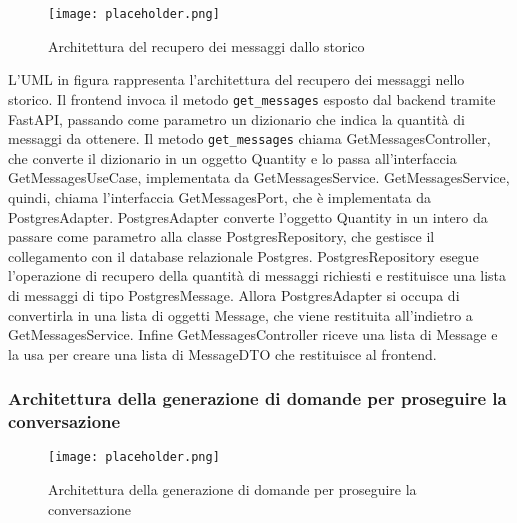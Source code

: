 \begin{figure}[h]
    \centering
    \texttt{[image: placeholder.png]}
    \caption{Architettura del recupero dei messaggi dallo storico}
\end{figure}

L'UML in figura rappresenta l'architettura del recupero dei messaggi nello storico.
Il frontend invoca il metodo \texttt{get\_messages} esposto dal backend tramite FastAPI, passando come parametro un dizionario che indica la quantità di messaggi da ottenere.
Il metodo \texttt{get\_messages} chiama GetMessagesController, che converte il dizionario in un oggetto Quantity e lo passa all'interfaccia GetMessagesUseCase, implementata da GetMessagesService.
GetMessagesService, quindi, chiama l'interfaccia GetMessagesPort, che è implementata da PostgresAdapter.
PostgresAdapter converte l'oggetto Quantity in un intero da passare come parametro alla classe PostgresRepository, che gestisce il collegamento con il database relazionale Postgres. 
PostgresRepository esegue l’operazione di recupero della quantità di messaggi richiesti e restituisce una lista di messaggi di tipo PostgresMessage.
Allora PostgresAdapter si occupa di convertirla in una lista di oggetti Message, che viene restituita all'indietro a GetMessagesService.
Infine GetMessagesController riceve una lista di Message e la usa per creare una lista di MessageDTO che restituisce al frontend.

\newpage


\subsubsection{Architettura della generazione di domande per proseguire la conversazione}
\label{sec:architettura_generazione_domande_conversazione}

\begin{figure}[h]
    \centering
    \texttt{[image: placeholder.png]}
    \caption{Architettura della generazione di domande per proseguire la conversazione}
\end{figure}

